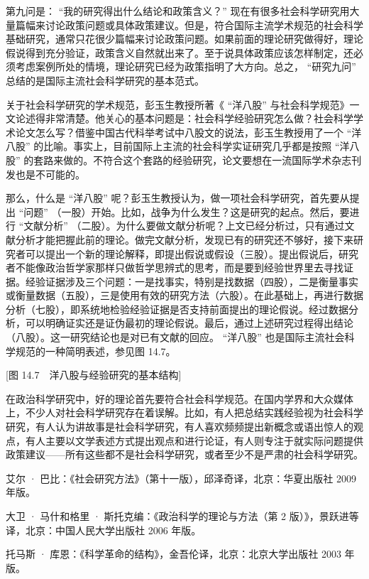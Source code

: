 第九问是： “我的研究得出什么结论和政策含义？” 现在有很多社会科学研究用大量篇幅来讨论政策问题或具体政策建议。但是，符合国际主流学术规范的社会科学基础研究，通常只花很少篇幅来讨论政策问题。如果前面的理论研究做得好，理论假说得到充分验证，政策含义自然就出来了。至于说具体政策应该怎样制定，还必须考虑案例所处的情境，理论研究已经为政策指明了大方向。总之， “研究九问” 总结的是国际主流社会科学研究的基本范式。

关于社会科学研究的学术规范，彭玉生教授所著《 “洋八股” 与社会科学规范》一文论述得非常清楚。他关心的基本问题是：社会科学经验研究怎么做？社会科学学术论文怎么写？借鉴中国古代科举考试中八股文的说法，彭玉生教授用了一个 “洋八股” 的比喻。事实上，目前国际上主流的社会科学实证研究几乎都是按照 “洋八股” 的套路来做的。不符合这个套路的经验研究，论文要想在一流国际学术杂志刊发也是不可能的。

那么，什么是 “洋八股” 呢？彭玉生教授认为，做一项社会科学研究，首先要从提出 “问题” （一股）开始。比如，战争为什么发生？这是研究的起点。然后，要进行 “文献分析” （二股）。为什么要做文献分析呢？上文已经分析过，只有通过文献分析才能把握此前的理论。做完文献分析，发现已有的研究还不够好，接下来研究者可以提出一个新的理论解释，即提出假说或假设（三股）。提出假说后，研究者不能像政治哲学家那样只做哲学思辨式的思考，而是要到经验世界里去寻找证据。经验证据涉及三个问题：一是找事实，特别是找数据（四股），二是衡量事实或衡量数据（五股），三是使用有效的研究方法（六股）。在此基础上，再进行数据分析（七股），即系统地检验经验证据是否支持前面提出的理论假说。经过数据分析，可以明确证实还是证伪最初的理论假说。最后，通过上述研究过程得出结论（八股）。这一研究结论也是对已有文献的回应。 “洋八股” 也是国际主流社会科学规范的一种简明表述，参见图 14.7。

[图 14.7　洋八股与经验研究的基本结构]

在政治科学研究中，好的理论首先要符合社会科学规范。在国内学界和大众媒体上，不少人对社会科学研究存在着误解。比如，有人把总结实践经验视为社会科学研究，有人认为讲故事是社会科学研究，有人喜欢频频提出新概念或语出惊人的观点，有人主要以文学表述方式提出观点和进行论证，有人则专注于就实际问题提供政策建议——所有这些都不是社会科学研究，或者至少不是严肃的社会科学研究。


艾尔 · 巴比：《社会研究方法》（第十一版），邱泽奇译，北京：华夏出版社 2009 年版。

大卫 · 马什和格里 · 斯托克编：《政治科学的理论与方法（第 2 版）》，景跃进等译，北京：中国人民大学出版社 2006 年版。

托马斯 · 库恩：《科学革命的结构》，金吾伦译，北京：北京大学出版社 2003 年版。
